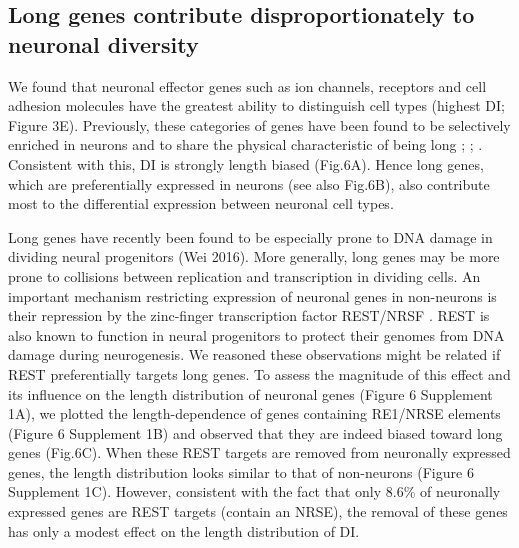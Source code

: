 \subsection{Long genes contribute disproportionately to neuronal diversity}

We found that neuronal effector genes such as ion channels, receptors and cell adhesion molecules have the greatest ability to distinguish cell types (highest DI; Figure 3E). Previously, these categories of genes have been found to be selectively enriched in neurons and to share the physical characteristic of being long \cite{Sugino_2014}; \cite{Gabel_2015}; \cite{Zylka_2015}. Consistent with this, DI is strongly length biased (Fig.6A). Hence long genes, which are preferentially expressed in neurons (see also Fig.6B), also contribute most to the differential expression between neuronal cell types. 

Long genes have recently been found to be especially prone to DNA damage in dividing neural progenitors (Wei 2016). More generally, long genes may be more prone to collisions between replication and transcription in dividing cells. An important mechanism restricting expression of neuronal genes in non-neurons is their repression by the zinc-finger transcription factor REST/NRSF \cite{RN1}\cite{RN2a}. REST is also known to function in neural progenitors to protect their genomes from DNA damage during neurogenesis\cite{Nechiporuk_2016}. We reasoned these observations might be related if REST preferentially targets long genes. To assess the magnitude of this effect and its influence on the length distribution of neuronal genes (Figure 6 Supplement 1A), we plotted the length-dependence of genes containing RE1/NRSE elements (Figure 6 Supplement 1B) and observed that they are indeed biased toward long genes (Fig.6C). When these REST targets are removed from neuronally expressed genes, the length distribution looks similar to that of non-neurons (Figure 6 Supplement 1C). However, consistent with the fact that only 8.6\% of neuronally expressed genes are REST targets (contain an NRSE), the removal of these genes has only a modest effect on the length distribution of DI.  

